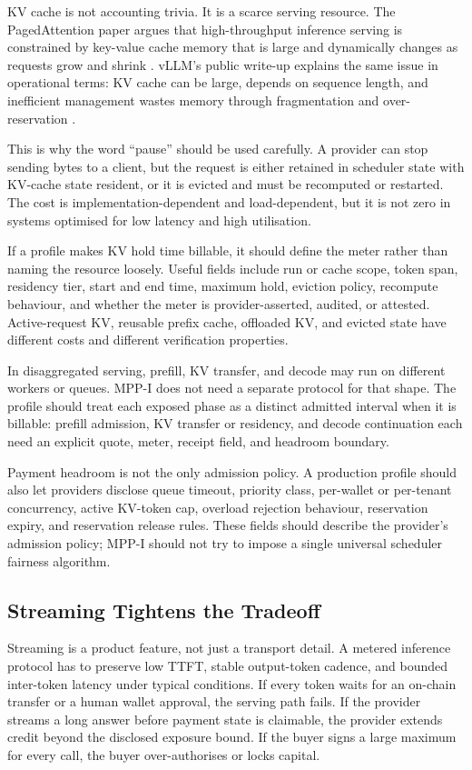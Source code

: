 \documentclass[11pt]{article}
\newcommand{\mppi}{MPP-I}
\begin{document}
KV cache is not accounting trivia. It is a scarce serving resource. The PagedAttention paper argues that high-throughput inference serving is constrained by key-value cache memory that is large and dynamically changes as requests grow and shrink \cite{pagedAttention}. vLLM's public write-up explains the same issue in operational terms: KV cache can be large, depends on sequence length, and inefficient management wastes memory through fragmentation and over-reservation \cite{vllmBlog}.

This is why the word ``pause'' should be used carefully. A provider can stop sending bytes to a client, but the request is either retained in scheduler state with KV-cache state resident, or it is evicted and must be recomputed or restarted. The cost is implementation-dependent and load-dependent, but it is not zero in systems optimised for low latency and high utilisation.

If a profile makes KV hold time billable, it should define the meter rather than naming the resource loosely. Useful fields include run or cache scope, token span, residency tier, start and end time, maximum hold, eviction policy, recompute behaviour, and whether the meter is provider-asserted, audited, or attested. Active-request KV, reusable prefix cache, offloaded KV, and evicted state have different costs and different verification properties.

In disaggregated serving, prefill, KV transfer, and decode may run on different workers or queues. \mppi{} does not need a separate protocol for that shape. The profile should treat each exposed phase as a distinct admitted interval when it is billable: prefill admission, KV transfer or residency, and decode continuation each need an explicit quote, meter, receipt field, and headroom boundary.

Payment headroom is not the only admission policy. A production profile should also let providers disclose queue timeout, priority class, per-wallet or per-tenant concurrency, active KV-token cap, overload rejection behaviour, reservation expiry, and reservation release rules. These fields should describe the provider's admission policy; \mppi{} should not try to impose a single universal scheduler fairness algorithm.

\subsection{Streaming Tightens the Tradeoff}

Streaming is a product feature, not just a transport detail. A metered inference protocol has to preserve low TTFT, stable output-token cadence, and bounded inter-token latency under typical conditions. If every token waits for an on-chain transfer or a human wallet approval, the serving path fails. If the provider streams a long answer before payment state is claimable, the provider extends credit beyond the disclosed exposure bound. If the buyer signs a large maximum for every call, the buyer over-authorises or locks capital.
\end{document}
